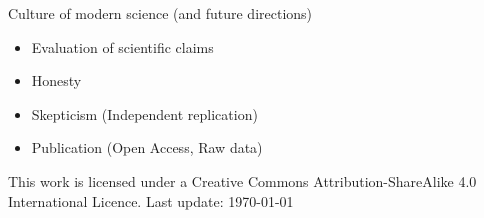 \documentclass{beamer}
\begin{document}
\begin{frame}{Culture of modern science (and future directions)}
	\begin{itemize}
		\item Evaluation of scientific claims
		\item Honesty
		\item Skepticism	(Independent replication)
		\item Publication	 (Open Access, Raw data)
	\end{itemize}
	\vspace{12pt}

\tiny
This work is licensed under a Creative Commons Attribution-ShareAlike
4.0 International Licence. Last update: \today
	
\end{frame}
\end{document}
